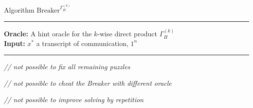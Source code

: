 \begin{codeblock}
  Algorithm $\text{Breaker}^{\Gamma_H^{(k)}}$
  \medskip \hrule \medskip

  \textbf{Oracle:} A hint oracle for the $k$-wise direct product $\Gamma_H^{(k)}$  \\
  \textbf{Input:}  $x^*$ a transcript of communication, $1^{n}$

  \medskip\hrule\medskip
  \textit{// not possible to fix all remaining puzzles}

  \textit{// not possible to cheat the Breaker with different oracle}

  \textit{// not possible to improve solving by repetition}
\end{codeblock}
